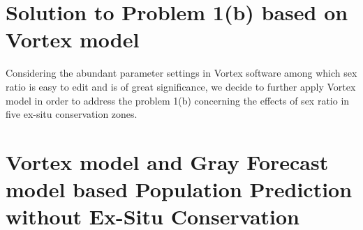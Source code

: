 \documentclass{mcmthesis}
\numberwithin{figure}{section}
\numberwithin{table}{section}
\numberwithin{equation}{section}
\begin{document}
\begin{figure}[htbp]
  \centering
\end{figure}


 

\section{Solution to Problem 1(b) based on Vortex model}
Considering the abundant parameter settings in Vortex software among which sex ratio 
is easy to edit and is of great significance, we decide to further apply Vortex model
in order to address the problem 1(b) concerning the effects of sex ratio in five ex-situ
conservation zones.
\par



\section{Vortex model and Gray Forecast model based
Population Prediction without Ex-Situ Conservation}
\end{document}
